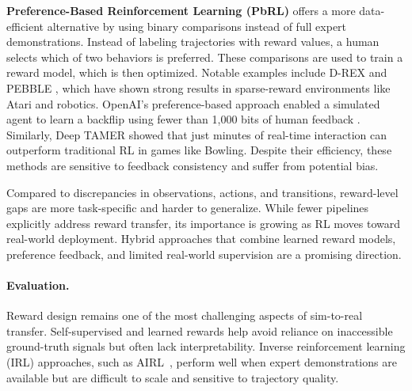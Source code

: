 \textbf{Preference-Based Reinforcement Learning (PbRL)} offers a more data-efficient alternative by using binary comparisons instead of full expert demonstrations. Instead of labeling trajectories with reward values, a human selects which of two behaviors is preferred. These comparisons are used to train a reward model, which is then optimized. Notable examples include D-REX \cite{Brown2019} and PEBBLE \cite{Lee2021}, which have shown strong results in sparse-reward environments like Atari and robotics. OpenAI’s preference-based approach enabled a simulated agent to learn a backflip using fewer than 1{,}000 bits of human feedback \cite{Christiano2017}. Similarly, Deep TAMER \cite{Warnell2017} showed that just minutes of real-time interaction can outperform traditional RL in games like Bowling. Despite their efficiency, these methods are sensitive to feedback consistency and suffer from potential bias.

\begin{table*}[t]
\centering
\caption{Comparison of Reward-Level Transfer Methods}
\label{tab:reward_methods}
\end{table*}

Compared to discrepancies in observations, actions, and transitions, reward-level gaps are more task-specific and harder to generalize. While fewer \simtoreal pipelines explicitly address reward transfer, its importance is growing as RL moves toward real-world deployment. Hybrid approaches that combine learned reward models, preference feedback, and limited real-world supervision are a promising direction.

\paragraph{Evaluation.} Reward design remains one of the most challenging aspects of sim-to-real transfer. Self-supervised and learned rewards help avoid reliance on inaccessible ground-truth signals but often lack interpretability. Inverse reinforcement learning (IRL) approaches, such as AIRL~\cite{Fu2018}, perform well when expert demonstrations are available but are difficult to scale and sensitive to trajectory quality.